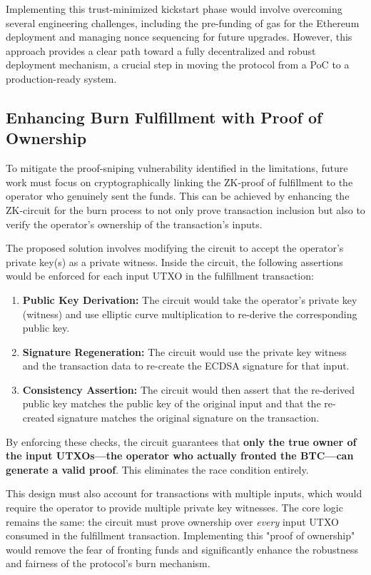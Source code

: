 \documentclass{DESSThesis}
\begin{document}
Implementing this trust-minimized kickstart phase would involve overcoming several engineering challenges, including the pre-funding of gas for the Ethereum deployment and managing nonce sequencing for future upgrades. However, this approach provides a clear path toward a fully decentralized and robust deployment mechanism, a crucial step in moving the protocol from a PoC to a production-ready system.

\subsection{Enhancing Burn Fulfillment with Proof of Ownership}

To mitigate the proof-sniping vulnerability identified in the limitations, future work must focus on cryptographically linking the ZK-proof of fulfillment to the operator who genuinely sent the funds. This can be achieved by enhancing the ZK-circuit for the burn process to not only prove transaction inclusion but also to verify the operator's ownership of the transaction's inputs.

The proposed solution involves modifying the circuit to accept the operator's private key(s) as a private witness. Inside the circuit, the following assertions would be enforced for each input UTXO in the fulfillment transaction:
\begin{enumerate}
    \item \textbf{Public Key Derivation:} The circuit would take the operator's private key (witness) and use elliptic curve multiplication to re-derive the corresponding public key.
    \item \textbf{Signature Regeneration:} The circuit would use the private key witness and the transaction data to re-create the ECDSA signature for that input.
    \item \textbf{Consistency Assertion:} The circuit would then assert that the re-derived public key matches the public key of the original input and that the re-created signature matches the original signature on the transaction.
\end{enumerate}

By enforcing these checks, the circuit guarantees that \textbf{only the true owner of the input UTXOs—the operator who actually fronted the BTC—can generate a valid proof}. This eliminates the race condition entirely.

This design must also account for transactions with multiple inputs, which would require the operator to provide multiple private key witnesses. The core logic remains the same: the circuit must prove ownership over \textit{every} input UTXO consumed in the fulfillment transaction. Implementing this "proof of ownership" would remove the fear of fronting funds and significantly enhance the robustness and fairness of the protocol's burn mechanism.
\end{document}
